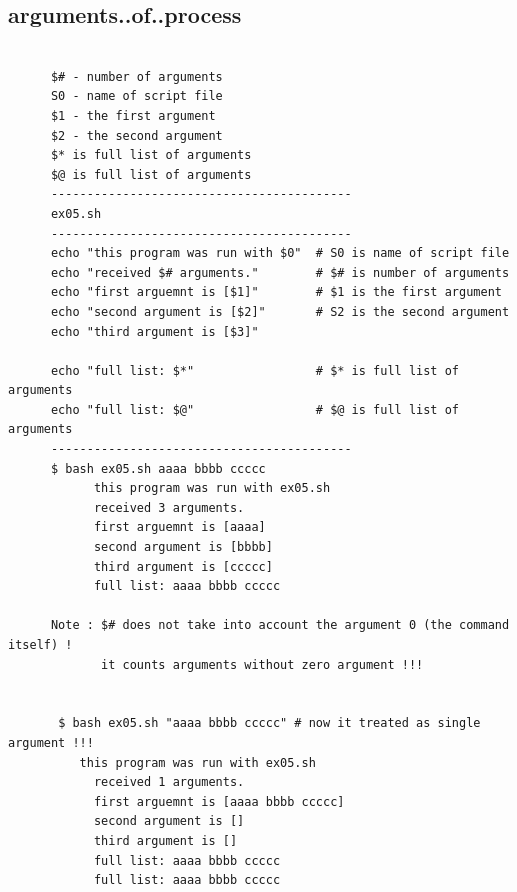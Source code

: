 \documentclass[a4paper,12pt]{article}
\begin{document}
\subsection{arguments..of..process  }
\begin{verbatim}

      $# - number of arguments
      S0 - name of script file
      $1 - the first argument
      $2 - the second argument
      $* is full list of arguments
      $@ is full list of arguments
      ------------------------------------------
      ex05.sh 
      ------------------------------------------
      echo "this program was run with $0"  # S0 is name of script file
      echo "received $# arguments."        # $# is number of arguments
      echo "first arguemnt is [$1]"        # $1 is the first argument
      echo "second argument is [$2]"       # S2 is the second argument
      echo "third argument is [$3]"

      echo "full list: $*"                 # $* is full list of arguments
      echo "full list: $@"                 # $@ is full list of arguments
      ------------------------------------------
      $ bash ex05.sh aaaa bbbb ccccc
            this program was run with ex05.sh
            received 3 arguments.
            first arguemnt is [aaaa]
            second argument is [bbbb]
            third argument is [ccccc]
            full list: aaaa bbbb ccccc
            
      Note : $# does not take into account the argument 0 (the command itself) !
             it counts arguments without zero argument !!!      
       
       
       $ bash ex05.sh "aaaa bbbb ccccc" # now it treated as single argument !!!
          this program was run with ex05.sh
            received 1 arguments.
            first arguemnt is [aaaa bbbb ccccc]
            second argument is [] 
            third argument is []
            full list: aaaa bbbb ccccc
            full list: aaaa bbbb ccccc
 
            
\end{verbatim}
\end{document}
